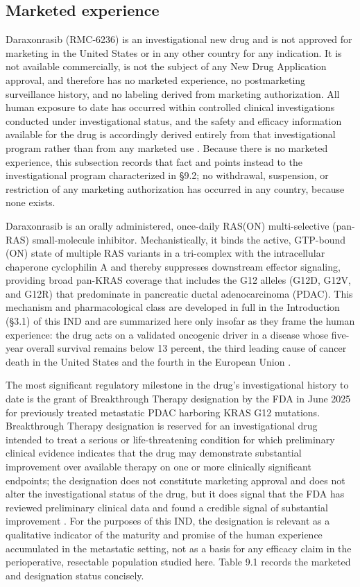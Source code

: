 \subsection{Marketed experience}

Daraxonrasib (RMC-6236) is an investigational new drug and is not approved for
marketing in the United States or in any other country for any indication. It is
not available commercially, is not the subject of any New Drug Application
approval, and therefore has no marketed experience, no postmarketing surveillance
history, and no labeling derived from marketing authorization. All human exposure
to date has occurred within controlled clinical investigations conducted under
investigational status, and the safety and efficacy information available for the
drug is accordingly derived entirely from that investigational program rather than
from any marketed use \cite{daraxwhipple}. Because there is no marketed experience,
this subsection records that fact and points instead to the investigational
program characterized in \S 9.2; no withdrawal, suspension, or restriction of any
marketing authorization has occurred in any country, because none exists.

Daraxonrasib is an orally administered, once-daily RAS(ON) multi-selective
(pan-RAS) small-molecule inhibitor. Mechanistically, it binds the active,
GTP-bound (ON) state of multiple RAS variants in a tri-complex with the
intracellular chaperone cyclophilin A and thereby suppresses downstream effector
signaling, providing broad pan-KRAS coverage that includes the G12 alleles
(G12D, G12V, and G12R) that predominate in pancreatic ductal adenocarcinoma
(PDAC). This mechanism and pharmacological class are developed in full in the
Introduction (\S 3.1) of this IND and are summarized here only insofar as they
frame the human experience: the drug acts on a validated oncogenic driver in a
disease whose five-year overall survival remains below 13 percent, the third
leading cause of cancer death in the United States and the fourth in the European
Union \cite{pdac060s2030}.

The most significant regulatory milestone in the drug's investigational history to
date is the grant of Breakthrough Therapy designation by the FDA in June 2025 for
previously treated metastatic PDAC harboring KRAS G12 mutations. Breakthrough
Therapy designation is reserved for an investigational drug intended to treat a
serious or life-threatening condition for which preliminary clinical evidence
indicates that the drug may demonstrate substantial improvement over available
therapy on one or more clinically significant endpoints; the designation does not
constitute marketing approval and does not alter the investigational status of the
drug, but it does signal that the FDA has reviewed preliminary clinical data and
found a credible signal of substantial improvement \cite{daraxwhipple,
phase1guidance}. For the purposes of this IND, the designation is relevant as a
qualitative indicator of the maturity and promise of the human experience
accumulated in the metastatic setting, not as a basis for any efficacy claim in the
perioperative, resectable population studied here. Table 9.1 records the marketed and
designation status concisely.

